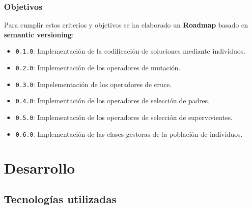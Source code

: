\documentclass{beamer}
\begin{document}
\begin{frame}
\frametitle{Objetivos}

Para cumplir estos criterios y objetivos se ha elaborado un \textbf{Roadmap} basado en \textbf{semantic versioning}:

\bigskip

\begin{itemize}
    \item \texttt{0.1.0}: Implementación de la codificación de soluciones mediante individuos.
    \item \texttt{0.2.0}: Implementación de los operadores de mutación.
    \item \texttt{0.3.0}: Impelementación de los operadores de cruce.
    \item \texttt{0.4.0}: Implementación de los operadores de selección de padres. 
    \item \texttt{0.5.0}: Implementación de los operadores de selección de supervivientes.
    \item \texttt{0.6.0}: Implementación de las clases gestoras de la población de individuos.
\end{itemize}

\end{frame}

\section{Desarrollo}


\subsection{Tecnologías utilizadas}
\end{document}
